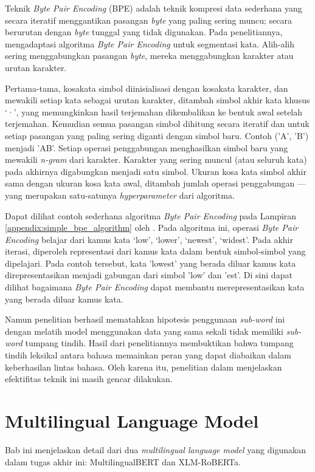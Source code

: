    Teknik \textit{Byte Pair Encoding} (BPE) \parencite{GageBPE1994} adalah teknik kompresi data sederhana yang secara iteratif menggantikan pasangan \textit{byte} yang paling sering muncu; secara berurutan dengan \textit{byte} tunggal yang tidak digunakan. Pada penelitiannya, \parencite{Sennrich_Haddow_Birch_2016} mengadaptasi algoritma \textit{Byte Pair Encoding} untuk segmentasi kata. Alih-alih sering menggabungkan pasangan \textit{byte}, mereka menggabungkan karakter atau urutan karakter.

    Pertama-tama, kosakata simbol diinisialisasi dengan kosakata karakter, dan mewakili setiap kata sebagai urutan karakter, ditambah simbol akhir kata khusus ‘·’, yang memungkinkan hasil terjemahan dikembalikan ke bentuk awal setelah terjemahan. Kemudian semua pasangan simbol dihitung secara iteratif dan untuk setiap pasangan yang paling sering diganti dengan simbol baru. Contoh ('A', 'B') menjadi 'AB'. Setiap operasi penggabungan menghasilkan simbol baru yang mewakili \textit{n-gram} dari karakter. Karakter yang sering muncul (atau seluruh kata) pada akhirnya digabungkan menjadi satu simbol. Ukuran kosa kata simbol akhir sama dengan ukuran kosa kata awal, ditambah jumlah operasi penggabungan --- yang merupakan satu-satunya \textit{hyperparameter} dari algoritma.

    Dapat dilihat contoh sederhana algoritma \textit{Byte Pair Encoding} pada Lampiran \ref{appendix:simple_bpe_algorithm} oleh \parencite{Sennrich_Haddow_Birch_2016}. Pada algoritma ini, operasi \textit{Byte Pair Encoding} belajar dari kamus kata {‘low’, ‘lower’, ‘newest’, ‘widest’}. Pada akhir iterasi, diperoleh representasi dari kamus kata dalam bentuk simbol-simbol yang dipelajari. Pada contoh tersebut, kata 'lowest' yang berada diluar kamus kata direpresentasikan menjadi gabungan dari simbol 'low' dan 'est'. Di sini dapat dilihat bagaimana \textit{Byte Pair Encoding} dapat membantu merepresentasikan kata yang berada diluar kamus kata. 

    Namun penelitian \parencite{K_Wang_Mayhew_Roth_2020} berhasil mematahkan hipotesis penggunaan \textit{sub-word} ini dengan melatih model menggunakan data yang sama sekali tidak memiliki \textit{sub-word} tumpang tindih. Hasil dari penelitiannya membuktikan bahwa tumpang tindih leksikal antara bahasa memainkan peran yang dapat diabaikan dalam keberhasilan lintas bahasa. Oleh karena itu, penelitian dalam menjelaskan efektifitas teknik ini masih gencar dilakukan.

\section{Multilingual Language Model}
    Bab ini menjelaskan detail dari dua \textit{multilingual language model} yang digunakan dalam tugas akhir ini: MultilingualBERT dan XLM-RoBERTa.

